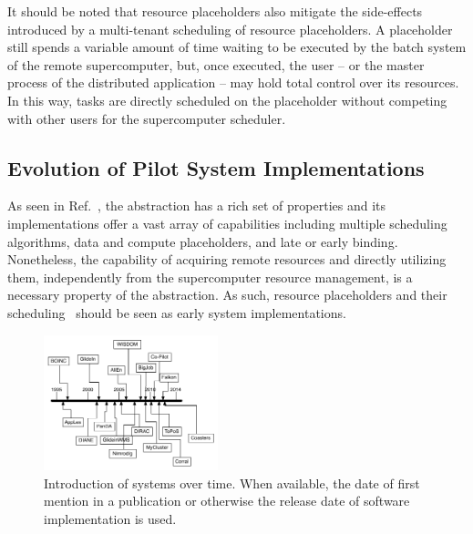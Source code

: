 \documentclass{sig-alternate}
\begin{document}
It should be noted that resource placeholders also mitigate the side-effects
introduced by a multi-tenant scheduling of resource placeholders. A placeholder
still spends a variable amount of time waiting to be executed by the batch
system of the remote supercomputer, but, once executed, the user -- or the
master process of the distributed application -- may hold total control over its
resources. In this way, tasks are directly scheduled on the placeholder without
competing with other users for the supercomputer scheduler.

\subsection{Evolution of Pilot System Implementations}
\label{sec:histimpl}

As seen in Ref.~\cite{pstar-2012}, the \pilot abstraction has a rich set of
properties and its implementations offer a vast array of capabilities including
multiple scheduling algorithms, data and compute placeholders, and late or early
binding. Nonetheless, the capability of acquiring remote resources and directly
utilizing them, independently from the supercomputer resource management, is a
necessary property of the \pilot abstraction. As such, resource placeholders and
their scheduling~\cite{Pinchak02practicalheterogeneous} should be seen as early
\pilot system implementations.


\begin{figure}[t]
  \centering
    \includegraphics[width=0.45\textwidth]{figures/timeline}
    \caption{Introduction of systems over time. When available, the date of
    first mention in a publication or otherwise the release date of software
    implementation is used.}
    \label{fig:timeline}
\end{figure}
\end{document}
